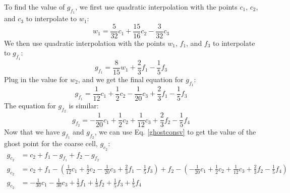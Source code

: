 \documentclass[12pt]{article}
\begin{document}
To find the value of $g_{f_1}$, we first use quadratic interpolation with the points 
$c_1$, $c_2$, and $c_3$ to interpolate to $w_1$:
\begin{equation*}
    w_1=\frac{5}{32}c_1+\frac{15}{16}c_2-\frac{3}{32}c_3
\end{equation*}
We then use quadratic interpolation with the points 
$w_1$, $f_1$, and $f_3$ to interpolate to $g_{f_1}$:
\begin{equation*}
    g_{f_1}=\frac{8}{15}w_1+\frac{2}{3}f_1-\frac{1}{5}f_3
\end{equation*}
Plug in the value for $w_2$, and we get the final equation for $g_{f_1}$:
\begin{equation*}
    g_{f_1}=\frac{1}{12}c_1+\frac{1}{2}c_2-\frac{1}{20}c_3 +\frac{2}{3}f_1-\frac{1}{5}f_3
\end{equation*}
The equation for $g_{f_2}$ is similar:
\begin{equation*}
    g_{f_2}=-\frac{1}{20}c_1+\frac{1}{2}c_2+\frac{1}{12}c_3 +\frac{2}{3}f_2-\frac{1}{5}f_4
\end{equation*}
Now that we have $g_{f_1}$ and $g_{f_2}$, we can use Eq. \ref{ghostconsv} to get the value of
the ghost point for the coarse cell, $g_{c_2}$:
\begin{align*}
    g_{c_2}&=c_2+f_1-g_{f_1}+f_2-g_{f_2}\\
    g_{c_2}&=c_2+f_1-\left(\frac{1}{12}c_1+\frac{1}{2}c_2-\frac{1}{20}c_3 +\frac{2}{3}f_1-
    \frac{1}{5}f_3\right)+f_2-\left(-\frac{1}{20}c_1+\frac{1}{2}c_2+\frac{1}{12}c_3
    +\frac{2}{3}f_2-\frac{1}{5}f_4\right)\\
    g_{c_2}&=-\frac{1}{30}c_1-\frac{1}{30}c_3+\frac{1}{3}f_1+\frac{1}{3}f_2+\frac{1}{5}f_3+
    \frac{1}{5}f_4
\end{align*}
\end{document}
